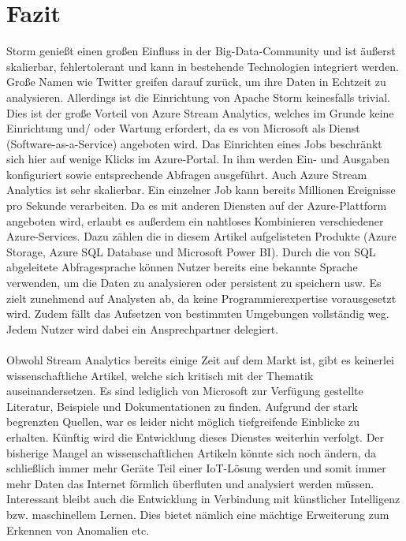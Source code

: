 \section{Fazit}
Storm genießt einen großen Einfluss in der Big-Data-Community und ist äußerst skalierbar, fehlertolerant und kann in bestehende Technologien integriert werden. Große Namen wie Twitter greifen darauf zurück, um ihre Daten in Echtzeit zu analysieren. Allerdings ist die Einrichtung von Apache Storm keinesfalls trivial. Dies ist der große Vorteil von Azure Stream Analytics, welches im Grunde keine Einrichtung und/ oder Wartung erfordert, da es von Microsoft als Dienst (Software-as-a-Service) angeboten wird. Das Einrichten eines Jobs beschränkt sich hier auf wenige Klicks im Azure-Portal. In ihm werden Ein- und Ausgaben konfiguriert sowie entsprechende Abfragen ausgeführt. Auch Azure Stream Analytics ist sehr skalierbar. Ein einzelner Job kann bereits Millionen Ereignisse pro Sekunde verarbeiten. Da es mit anderen Diensten auf der Azure-Plattform angeboten wird, erlaubt es außerdem ein nahtloses Kombinieren verschiedener Azure-Services. Dazu zählen die in diesem Artikel aufgelisteten Produkte (Azure Storage, Azure SQL Database und Microsoft Power BI). Durch die von SQL abgeleitete Abfragesprache können Nutzer bereits eine bekannte Sprache verwenden, um die Daten zu analysieren oder persistent zu speichern usw. Es zielt zunehmend auf Analysten ab, da keine Programmierexpertise vorausgesetzt wird. Zudem fällt das Aufsetzen von bestimmten Umgebungen vollständig weg. Jedem Nutzer wird dabei ein Ansprechpartner delegiert.\\ \\ Obwohl Stream Analytics bereits einige Zeit auf dem Markt ist, gibt es keinerlei wissenschaftliche Artikel, welche sich kritisch mit der Thematik auseinandersetzen. Es sind lediglich von Microsoft zur Verfügung gestellte Literatur, Beispiele und Dokumentationen zu finden. Aufgrund der stark begrenzten Quellen, war es leider nicht möglich tiefgreifende Einblicke zu erhalten. Künftig wird die Entwicklung dieses Dienstes weiterhin verfolgt. Der bisherige Mangel an wissenschaftlichen Artikeln könnte sich noch ändern, da schließlich immer mehr Geräte Teil einer IoT-Lösung werden und somit immer mehr Daten das Internet förmlich überfluten und analysiert werden müssen. Interessant bleibt auch die Entwicklung in Verbindung mit künstlicher Intelligenz bzw. maschinellem Lernen. Dies bietet nämlich eine mächtige Erweiterung zum Erkennen von Anomalien etc.



\ifCLASSOPTIONcaptionsoff
  \newpage
\fi